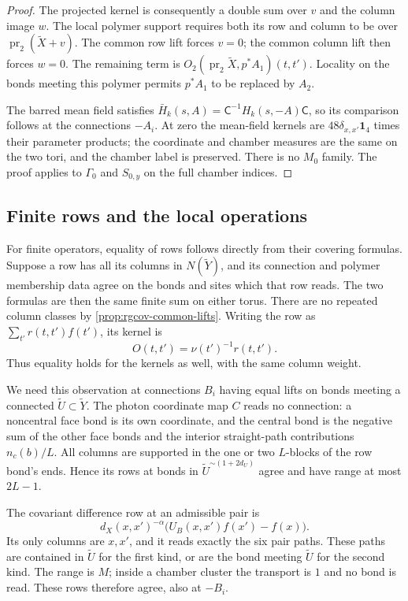 \begin{proof}
The projected kernel is consequently a double sum over
$v$ and the column image $w$. The local polymer support
requires both its row and column to be over
$\operatorname{pr}_2(\widetilde X+v)$.
The common row lift forces $v=0$; the common column
lift then forces $w=0$. The remaining term is
$O_2(\operatorname{pr}_2\widetilde X,p^*A_1)(t,t')$.
Locality on the bonds meeting this polymer permits
$p^*A_1$ to be replaced by $A_2$.

The barred mean field satisfies
$\bar H_k(s,A)=\mathsf C^{-1}H_k(s,-A)\mathsf C$,
so its comparison follows at the connections $-A_i$.
At zero the mean-field kernels are
$48\delta_{x,x'}\mathbf1_4$ times their parameter products;
the coordinate and chamber measures are the same
on the two tori, and the chamber label is preserved.
There is no $M_0$ family. The proof applies to
$\Gamma_0$ and $S_{0,y}$ on the full chamber indices.
\end{proof}

\subsection{Finite rows and the local operations}
\label{subsec:rgcov-finite-rows}

For finite operators, equality of rows follows directly
from their covering formulas. Suppose a row has all its
columns in $N(\widetilde Y)$, and its connection and
polymer membership data agree on the bonds and sites
which that row reads. The two formulas are then the
same finite sum on either torus. There are no repeated
column classes by \cref{prop:rgcov-common-lifts}.
Writing the row as
$\sum_{t'}r(t,t')f(t')$, its kernel is
\begin{equation}\label{eq:rgcov-row-kernel-weight}
                           O(t,t')=\nu(t')^{-1}r(t,t').
\end{equation}
Thus equality holds for the kernels as well, with the
same column weight.

We need this observation at connections $B_i$ having
equal lifts on bonds meeting a connected
$\widetilde U\subset\widetilde Y$.
The photon coordinate map $C$ reads no connection:
a noncentral face bond is its own coordinate, and
the central bond is the negative sum of the other
face bonds and the interior straight-path contributions
$n_c(b)/L$. All columns are supported in the one or
two $L$-blocks of the row bond's ends. Hence its rows
at bonds in $\widetilde U^{\sim(1+2d_U)}$ agree and
have range at most $2L-1$.

The covariant difference row at an admissible pair is
\[
 d_X(x,x')^{-\alpha}
               \big(U_B(x,x')f(x')-f(x)\big).
\]
Its only columns are $x,x'$, and it reads exactly
the six pair paths. These paths are contained in
$\widetilde U$ for the first kind, or are the bond
meeting $\widetilde U$ for the second kind.
The range is $M$; inside a chamber cluster the
transport is $1$ and no bond is read.
These rows therefore agree, also at $-B_i$.


